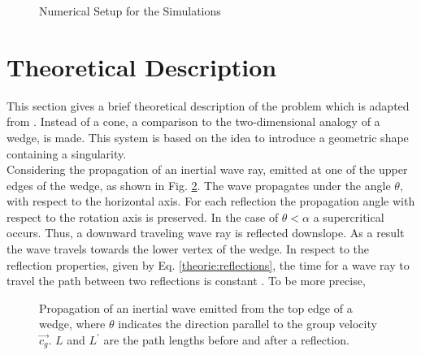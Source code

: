 
\begin{figure}[!bp]
  \centering
      \caption{Numerical Setup for the Simulations \label{cone:setup_image} }
\end{figure}
\clearpage

\section{Theoretical Description}
\label{cone:theorie_theo}

This section gives a brief theoretical description of the problem which is adapted from \citep{Greenspan1969, Beardsley1970}.
Instead of a cone, a comparison to the two-dimensional analogy of a wedge, is made.
This system is based on the idea to introduce a geometric shape containing a singularity.\\
Considering the propagation of an inertial wave ray, emitted at one of the upper edges of
the wedge, as shown in Fig. \ref{cone:theorie}.
The wave propagates under the angle $\theta$, with respect to the horizontal axis.
For each reflection the propagation angle with respect to the rotation axis is preserved.
In the case of $\theta<\alpha$ a supercritical occurs.
Thus, a downward traveling wave ray is reflected downslope.
As a result the wave travels towards the lower vertex of the wedge.
In respect to the reflection properties, given by Eq. \ref{theorie:reflections},
the time for a wave ray to travel the path between two reflections is constant \citep{Beardsley1970}.
To be more precise,

\begin{figure}[!bp]
  \begin{minipage}[c]{0.6\textwidth}
      \centering
  \end{minipage}
  \begin{minipage}[c]{0.3\textwidth}
      \caption{
          Propagation of an inertial wave emitted from the top edge of a wedge,
           where $\theta$ indicates the direction parallel to the group velocity
            $\vec{c_g}$.  $L$ and $L^{\prime}$ are the path lengths before and after a reflection.
      \label{cone:theorie}
      }
  \end{minipage}
\end{figure}


